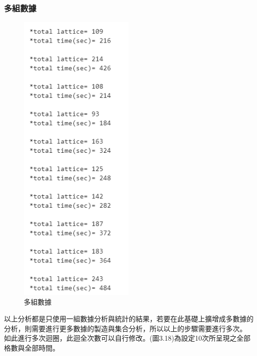 \subsubsection{多組數據}
	\begin{figure}[H] 
	\centering 
	\includegraphics[width=0.5\textwidth]{3_17.png} 
	\caption{多組數據} 
	\label{Fig.3.18} 
\end{figure}
以上分析都是只使用一組數據分析與統計的結果，若要在此基礎上擴增成多數據的分析，則需要進行更多數據的製造與集合分析，所以以上的步驟需要進行多次。
如此進行多次迴圈，此迴全次數可以自行修改。(圖3.18)為設定10次所呈現之全部格數與全部時間。
